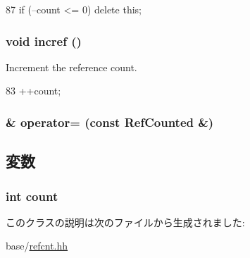 \begin{DoxyCode}
87 { if (--count <= 0) delete this; }
\end{DoxyCode}
\hypertarget{classRefCounted_ad16d34c97e8d6a988fd2b5ea36bccbf4}{
\subsubsection[{incref}]{\setlength{\rightskip}{0pt plus 5cm}void incref ()}}
\label{classRefCounted_ad16d34c97e8d6a988fd2b5ea36bccbf4}


Increment the reference count. 


\begin{DoxyCode}
83 { ++count; }
\end{DoxyCode}
\hypertarget{classRefCounted_a6d93b6225e8065317a03fd3eff362552}{
\subsubsection[{operator=}]{\& operator= (const {\bf RefCounted} \&)}}
\label{classRefCounted_a6d93b6225e8065317a03fd3eff362552}


\subsection{変数}
\hypertarget{classRefCounted_ad43c3812e6d13e0518d9f8b8f463ffcf}{
\subsubsection[{count}]{\setlength{\rightskip}{0pt plus 5cm}int {\bf count}}}
\label{classRefCounted_ad43c3812e6d13e0518d9f8b8f463ffcf}


このクラスの説明は次のファイルから生成されました:\begin{DoxyCompactItemize}
\item 
base/\hyperlink{refcnt_8hh}{refcnt.hh}\end{DoxyCompactItemize}
